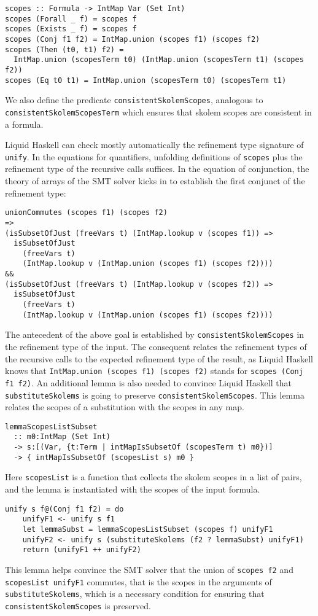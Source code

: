 \documentclass[sigconf, anonymous, review]{acmart}
\newcommand{\tc}[1]{{\small\texttt{#1}}}
\begin{document}
\begin{verbatim}
scopes :: Formula -> IntMap Var (Set Int)
scopes (Forall _ f) = scopes f
scopes (Exists _ f) = scopes f
scopes (Conj f1 f2) = IntMap.union (scopes f1) (scopes f2)
scopes (Then (t0, t1) f2) =
  IntMap.union (scopesTerm t0) (IntMap.union (scopesTerm t1) (scopes f2))
scopes (Eq t0 t1) = IntMap.union (scopesTerm t0) (scopesTerm t1)
\end{verbatim}

We also define the predicate \tc{consistentSkolemScopes}, analogous to
\tc{consistentSkolemScopesTerm} which ensures that skolem scopes are
consistent in a formula.

Liquid Haskell can check mostly automatically the refinement type signature of
\tc{unify}. In the equations for quantifiers, unfolding definitions of
\tc{scopes} plus the refinement type of the recursive calls suffices.
In the equation of conjunction, the theory of arrays of the SMT solver
kicks in to establish the first conjunct of the refinement type:

\begin{verbatim}
unionCommutes (scopes f1) (scopes f2)
=>
(isSubsetOfJust (freeVars t) (IntMap.lookup v (scopes f1)) =>
  isSubsetOfJust
    (freeVars t)
    (IntMap.lookup v (IntMap.union (scopes f1) (scopes f2))))
&&
(isSubsetOfJust (freeVars t) (IntMap.lookup v (scopes f2)) =>
  isSubsetOfJust
    (freeVars t)
    (IntMap.lookup v (IntMap.union (scopes f1) (scopes f2))))
\end{verbatim}

The antecedent of the above goal is established by \tc{consistent\-Skolem\-Scopes}
in the refinement type of the input. The consequent relates the refinement types
of the recursive calls to the expected refinement type of the result, as Liquid
Haskell knows that \tc{IntMap.\allowbreak union (scopes f1) (scopes f2)} stands for
\tc{scopes (Conj f1 f2)}. An additional lemma is also needed to convince Liquid
Haskell that \tc{substituteSkolems} is going to preserve \tc{consistentSkolemScopes}.
This lemma relates the scopes of a substitution with the scopes in any map.
\begin{verbatim}
lemmaScopesListSubset
  :: m0:IntMap (Set Int)
  -> s:[(Var, {t:Term | intMapIsSubsetOf (scopesTerm t) m0})]
  -> { intMapIsSubsetOf (scopesList s) m0 }
\end{verbatim}
Here \tc{scopesList} is a function that collects the skolem scopes in a list of
pairs, and the lemma is instantiated with the scopes of the input formula.
\begin{verbatim}
unify s f@(Conj f1 f2) = do
    unifyF1 <- unify s f1
    let lemmaSubst = lemmaScopesListSubset (scopes f) unifyF1
    unifyF2 <- unify s (substituteSkolems (f2 ? lemmaSubst) unifyF1)
    return (unifyF1 ++ unifyF2)
\end{verbatim}
This lemma helps convince the SMT solver that the union of \tc{scopes f2}
and \tc{scopesList unifyF1} commutes, that is the scopes in the arguments of
\tc{substituteSkolems}, which is a necessary condition for ensuring that
\tc{consistentSkolemScopes} is preserved.
\end{document}
